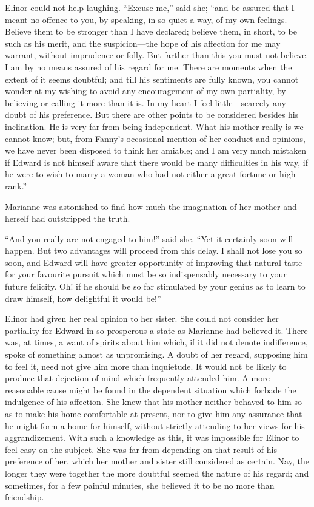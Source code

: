\documentclass{article}
\begin{document}
Elinor could not help laughing.  ``Excuse me,''
said she; ``and be assured that I meant no offence to you,
by speaking, in so quiet a way, of my own feelings.
Believe them to be stronger than I have declared;
believe them, in short, to be such as his merit, and the
suspicion---the hope of his affection for me may warrant,
without imprudence or folly.  But farther than this you must
not believe.  I am by no means assured of his regard for me.
There are moments when the extent of it seems doubtful;
and till his sentiments are fully known, you cannot wonder
at my wishing to avoid any encouragement of my own partiality,
by believing or calling it more than it is.  In my heart
I feel little---scarcely any doubt of his preference.
But there are other points to be considered besides
his inclination.  He is very far from being independent.
What his mother really is we cannot know; but, from Fanny's
occasional mention of her conduct and opinions, we have
never been disposed to think her amiable; and I am very
much mistaken if Edward is not himself aware that there
would be many difficulties in his way, if he were to wish
to marry a woman who had not either a great fortune or
high rank.''

Marianne was astonished to find how much the imagination
of her mother and herself had outstripped the truth.

``And you really are not engaged to him!'' said she.
``Yet it certainly soon will happen.  But two advantages
will proceed from this delay.  I shall not lose you so soon,
and Edward will have greater opportunity of improving
that natural taste for your favourite pursuit which must
be so indispensably necessary to your future felicity.
Oh! if he should be so far stimulated by your genius as to
learn to draw himself, how delightful it would be!''

Elinor had given her real opinion to her sister.
She could not consider her partiality for Edward
in so prosperous a state as Marianne had believed it.
There was, at times, a want of spirits about him which,
if it did not denote indifference, spoke of something almost
as unpromising.  A doubt of her regard, supposing him
to feel it, need not give him more than inquietude.
It would not be likely to produce that dejection of mind
which frequently attended him.  A more reasonable cause
might be found in the dependent situation which forbade
the indulgence of his affection.  She knew that his mother
neither behaved to him so as to make his home comfortable
at present, nor to give him any assurance that he might form
a home for himself, without strictly attending to her views
for his aggrandizement.  With such a knowledge as this,
it was impossible for Elinor to feel easy on the subject.
She was far from depending on that result of his preference
of her, which her mother and sister still considered
as certain.  Nay, the longer they were together the more
doubtful seemed the nature of his regard; and sometimes,
for a few painful minutes, she believed it to be no more
than friendship.
\end{document}
